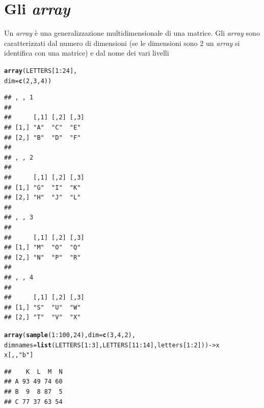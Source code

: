 \documentclass[onecolumn,12pt]{book}\usepackage[]{graphicx}\usepackage[]{color}
\makeatletter
\newcommand{\hlnum}[1]{\textcolor[rgb]{0.686,0.059,0.569}{#1}}%
\newcommand{\hlstr}[1]{\textcolor[rgb]{0.192,0.494,0.8}{#1}}%
\newcommand{\hlopt}[1]{\textcolor[rgb]{0,0,0}{#1}}%
\newcommand{\hlstd}[1]{\textcolor[rgb]{0.345,0.345,0.345}{#1}}%
\newcommand{\hlkwb}[1]{\textcolor[rgb]{0.69,0.353,0.396}{#1}}%
\newcommand{\hlkwc}[1]{\textcolor[rgb]{0.333,0.667,0.333}{#1}}%
\newcommand{\hlkwd}[1]{\textcolor[rgb]{0.737,0.353,0.396}{\textbf{#1}}}%
\newenvironment{kframe}{%
 \def\at@end@of@kframe{}%
 \ifinner\ifhmode%
  \def\at@end@of@kframe{\end{minipage}}%
  \begin{minipage}{\columnwidth}%
 \fi\fi%
 \def\FrameCommand##1{\hskip\@totalleftmargin \hskip-\fboxsep
 \colorbox{shadecolor}{##1}\hskip-\fboxsep
     \hskip-\linewidth \hskip-\@totalleftmargin \hskip\columnwidth}%
 \MakeFramed {\advance\hsize-\width
   \@totalleftmargin\z@ \linewidth\hsize
   \@setminipage}}%
 {\par\unskip\endMakeFramed%
 \at@end@of@kframe}
\newenvironment{knitrout}{}{} %
\makeatother
\begin{document}
\section{Gli \emph{array}}
Un \emph{array}  \`e una generalizzazione multidimensionale di una matrice. Gli \emph{array} sono caratterizzati dal numero di dimensioni  (se le dimensioni sono 2 un \emph{array} si identifica con una  matrice) e dal nome dei vari livelli
\begin{knitrout}
\color{fgcolor}\begin{kframe}
\begin{alltt}
\hlkwd{array}\hlstd{(LETTERS[}\hlnum{1}\hlopt{:}\hlnum{24}\hlstd{],}
\hlkwc{dim}\hlstd{=}\hlkwd{c}\hlstd{(}\hlnum{2}\hlstd{,}\hlnum{3}\hlstd{,}\hlnum{4}\hlstd{))}
\end{alltt}
\begin{verbatim}
## , , 1
## 
##      [,1] [,2] [,3]
## [1,] "A"  "C"  "E" 
## [2,] "B"  "D"  "F" 
## 
## , , 2
## 
##      [,1] [,2] [,3]
## [1,] "G"  "I"  "K" 
## [2,] "H"  "J"  "L" 
## 
## , , 3
## 
##      [,1] [,2] [,3]
## [1,] "M"  "O"  "Q" 
## [2,] "N"  "P"  "R" 
## 
## , , 4
## 
##      [,1] [,2] [,3]
## [1,] "S"  "U"  "W" 
## [2,] "T"  "V"  "X"
\end{verbatim}
\begin{alltt}
\hlkwd{array}\hlstd{(}\hlkwd{sample}\hlstd{(}\hlnum{1}\hlopt{:}\hlnum{100}\hlstd{,}\hlnum{24}\hlstd{),} \hlkwc{dim}\hlstd{=}\hlkwd{c}\hlstd{(}\hlnum{3}\hlstd{,}\hlnum{4}\hlstd{,}\hlnum{2}\hlstd{),}
      \hlkwc{dimnames}\hlstd{=}\hlkwd{list}\hlstd{(LETTERS[}\hlnum{1}\hlopt{:}\hlnum{3}\hlstd{],LETTERS[}\hlnum{11}\hlopt{:}\hlnum{14}\hlstd{],letters[}\hlnum{1}\hlopt{:}\hlnum{2}\hlstd{]))}\hlkwb{->}\hlstd{x}
\hlstd{x[,,}\hlstr{"b"}\hlstd{]}
\end{alltt}
\begin{verbatim}
##    K  L  M  N
## A 93 49 74 60
## B  9  8 87  5
## C 77 37 63 54
\end{verbatim}
\end{kframe}
\end{knitrout}
\end{document}
